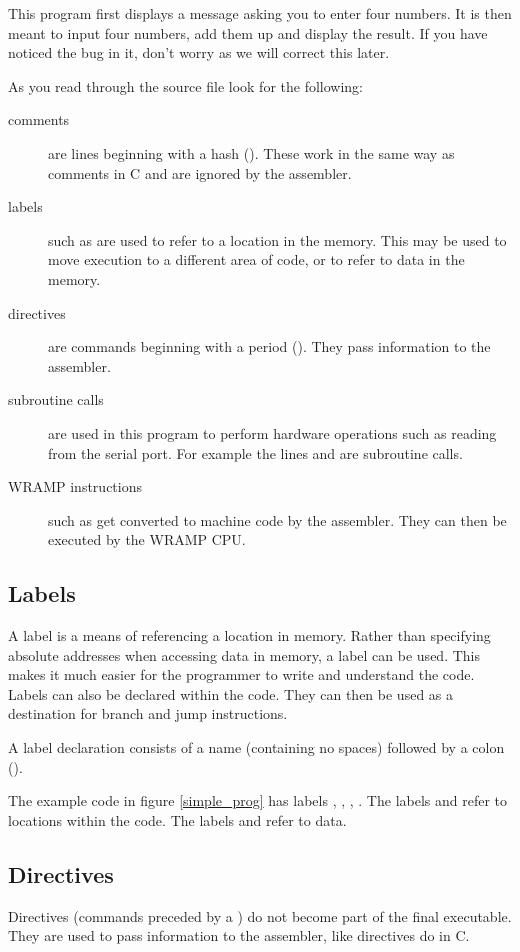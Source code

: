 This program first displays a message asking you to enter four numbers. It
is then meant to input four numbers, add them up and display the result. 
If you have noticed the bug in it, don't worry as we will correct this later.

As you read through the source file look for the following:

\begin{description}
\item[comments] are lines beginning with a hash (\src{\#}). These work in
the same way as \src{//} comments in C and are ignored by the assembler.
%
\item[labels] such as  are used to refer to a location in the
memory. This may be used to move execution to a different area of code,
or to refer to data in the memory.
%
\item[directives] are commands beginning with a period (). They
pass information to the assembler.
%
\item[subroutine calls] are used in this program to perform hardware
operations such as reading from the serial port. For example the
lines  and  are subroutine calls.
%
\item[WRAMP instructions] such as  get
converted to machine code by the assembler. They can then be executed by the
WRAMP CPU.
%
\end{description}

\subsection{Labels}
A label is a means of referencing a location in memory. Rather than
specifying absolute addresses when accessing data in memory, a label
can be used. This makes it much easier for the programmer to write
and understand the code. Labels can also be declared within the
code. They can then be used as a destination for branch and jump
instructions.

A label declaration consists of a name (containing no spaces) followed
by a colon (\src{:}).

The example code in figure \ref{simple_prog} has labels ,
, , . The labels
 and  refer to locations within the code. The
labels  and  refer to data.

\subsection{Directives}
Directives (commands preceded by a ) do not become part of the
final executable. They are used to pass information to the assembler,
like \src{\#} directives do in C.

